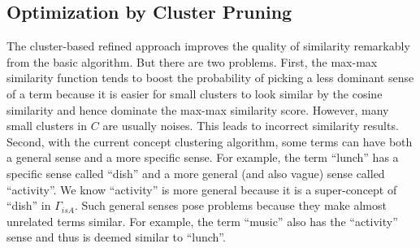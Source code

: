 \subsection{Optimization by Cluster Pruning}
The cluster-based refined approach improves the quality of similarity remarkably from
the basic algorithm. But there are two problems. First, the max-max similarity function tends to boost the probability of picking
a less dominant sense of a term because it is easier for
small clusters to look similar
by the cosine similarity and hence dominate the max-max similarity score. However, many small clusters in $C$ are usually noises. This leads to incorrect
similarity results.
%
Second, with the current concept clustering algorithm, some terms can have both a general sense and a more specific sense. For example, the term
``lunch'' has a specific sense called ``dish'' and a more general (and also vague) sense called ``activity''. We know ``activity'' is  more
general because it is a super-concept of ``dish'' in $\Gamma_{isA}$. Such general senses pose problems because they make almost unrelated terms
similar. For example, the term ``music'' also has the ``activity'' sense and thus is deemed similar to ``lunch''.
%
%

